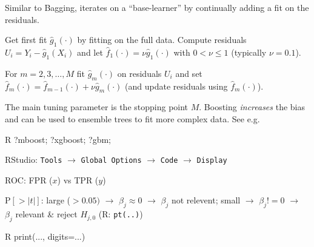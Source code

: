 \begin{sectionbox}[$L_{2}$Boosting]\nospacing{}
  Similar to Bagging, iterates on a ``base-learner'' by continually adding a fit on the residuals.
  \begin{enumeratenosep}[label=\roman*]
    \item Get first fit $\hat{g}_{1}(\cdot)$ by fitting on the full data. Compute residuals $U_{i} = Y_{i} - \hat{g}_{1}(X_{i})$ and let $\hat{f}_{1}(\cdot) = \nu \hat{g}_{1}(\cdot)$ with $0 < \nu \leq 1$ (typically $\nu = 0.1$).
    \item For $m = 2, 3, \dots, M$ fit $\hat{g}_{m}(\cdot)$ on residuals $U_{i}$ and set $\hat{f}_{m}(\cdot) = \hat{f}_{m-1}(\cdot) + \nu \hat{g}_{m}(\cdot)$ (and update residuals using $\hat{f}_{m}(\cdot)$).
  \end{enumeratenosep}
  The main tuning parameter is the stopping point $M$. Boosting \emph{increases} the bias and can be used to ensemble trees to fit more complex data. See e.g.
  \begin{mintlinebox}{R}
    ?mboost; ?xgboost; ?gbm;
  \end{mintlinebox}
\end{sectionbox}
\begin{notebox}[Misc]\nospacing{}
  \begin{enumeratenosep}[label=\roman*]
    \item RStudio: \texttt{Tools} $\rightarrow$ \texttt{Global Options} $\rightarrow$ \texttt{Code} $\rightarrow$ \texttt{Display}
    \item ROC: FPR ($x$) vs TPR ($y$)
    \item $\text{P}[>|t|]$: large ($>0.05)$ $\rightarrow$ $\beta_j \approx 0$ $\rightarrow$ $\beta_j$ not relevent; small $\rightarrow$ $\beta_j!=0$ $\rightarrow$ $\beta_j$ relevant \& reject $H_{j,0}$ (R: \texttt{pt(..)})
  \end{enumeratenosep}
  \begin{mintlinebox}{R}
    print(..., digits=...)
  \end{mintlinebox}
\end{notebox}